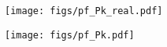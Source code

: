 \begin{figure}
\begin{center}
    \texttt{[image: figs/pf\_Pk\_real.pdf]} 
    \caption{    }
\label{fig:pk_real}
\end{center}
\end{figure}

\begin{figure}
\begin{center}
    \texttt{[image: figs/pf\_Pk.pdf]} 
    \caption{}
\label{fig:pk_rsd}
\end{center}
\end{figure}
